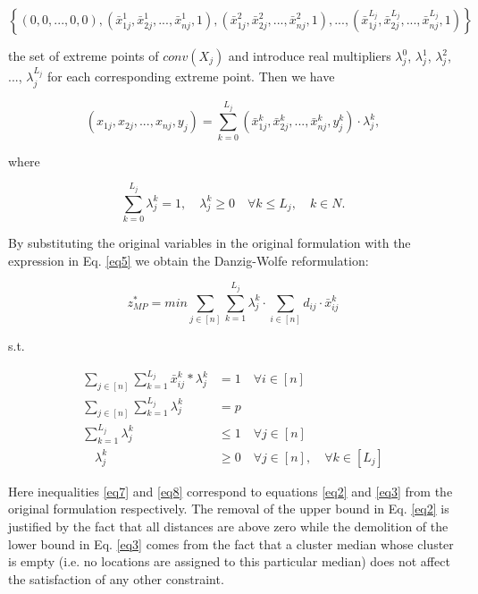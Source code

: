 \documentclass[
	11pt,
	DIV10,
	ngerman,
	a4paper,
	oneside,
	headings=normal,
	captions=tableheading,
	final,
	numbers=noenddot
]{scrartcl}
\begin{document}
\begin{equation}
	\left\{(0, 0, ..., 0, 0), (\bar{x}_{1j}^{1}, \bar{x}_{2j}^{1}, ..., \bar{x}_{nj}^{1}, 1), (\bar{x}_{1j}^{2}, \bar{x}_{2j}^{2}, ..., \bar{x}_{nj}^{2}, 1), ..., (\bar{x}_{1j}^{L_{j}}, \bar{x}_{2j}^{L_{j}}, ..., \bar{x}_{nj}^{L_{j}}, 1)\right\} \nonumber
\end{equation}

the set of extreme points of $ conv(X_{j}) $ and introduce real multipliers $ \lambda_{j}^{0} $, $ \lambda_{j}^{1} $, $ \lambda_{j}^{2} $, ..., $ \lambda_{j}^{L_{j}} $ for each corresponding extreme point. Then we have

\begin{equation}
	\label{eq5}
	(x_{1j}, x_{2j}, ..., x_{nj}, y_{j}) = \sum_{k = 0}^{L_{j}} (\bar{x}_{1j}^{k}, \bar{x}_{2j}^{k}, ..., \bar{x}_{nj}^{k}, y_{j}^{k}) \cdot \lambda_{j}^{k},
\end{equation}

where

\begin{equation}
	\sum_{k = 0}^{L_{j}} \lambda_{j}^{k} = 1, \quad \lambda_{j}^{k} \geq 0 \quad \forall k \leq L_{j}, \quad k \in N. \nonumber
\end{equation}

By substituting the original variables in the original formulation with the expression in Eq. \eqref{eq5} we obtain the Danzig-Wolfe reformulation:

\begin{equation}
	\label{eq6}
	z_{MP}^{*} = min \sum_{j \in [n]} \sum_{k = 1}^{L_{j}} \lambda_{j}^{k} \cdot \sum_{i \in [n]} d_{ij} \cdot \bar{x}_{ij}^{k}
\end{equation}

s.t.

\begin{align}
	\label{eq7} \sum_{j \in [n]} \sum_{k = 1}^{L_{j}} \bar{x}_{ij}^{k} * \lambda_{j}^{k} &= 1 \quad \forall i \in [n] \\[1em]
	\label{eq8} \sum_{j \in [n]} \sum_{k = 1}^{L_{j}} \lambda_{j}^{k} &= p \\[1em]
	\label{eq9} \sum_{k = 1}^{L_{j}} \lambda_{j}^{k} &\leq 1 \quad \forall j \in [n] \\[1em]
	\quad \lambda_{j}^{k} &\geq 0 \quad \forall j \in [n], \quad \forall k \in [L_{j}] \nonumber
\end{align}

Here inequalities \eqref{eq7} and \eqref{eq8} correspond to equations \eqref{eq2} and \eqref{eq3} from the original formulation respectively. The removal of the upper bound in Eq. \eqref{eq2} is justified by the fact that all distances are above zero while the demolition of the lower bound in Eq. \eqref{eq3} comes from the fact that a cluster median whose cluster is empty (i.e. no locations are assigned to this particular median) does not affect the satisfaction of any other constraint.
\end{document}
